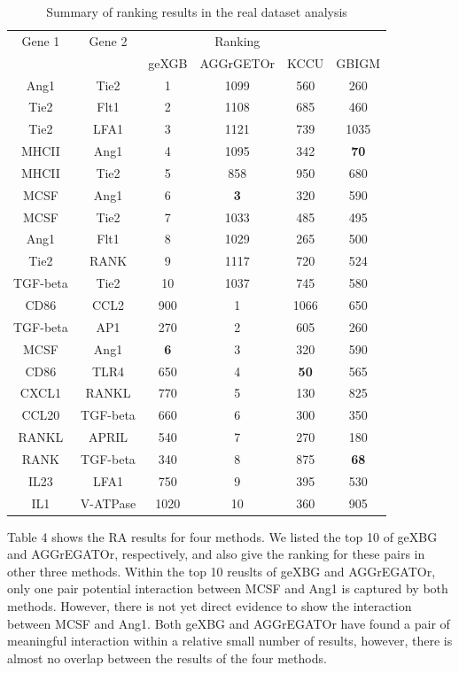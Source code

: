 \documentclass[11pt]{article}
\theoremstyle{plain}
\theoremstyle{definition}
\theoremstyle{remark}
\begin{document}
\begin{table}[H]\footnotesize
\centering
\caption{Summary of ranking results in the real dataset analysis}
\begin{tabular}{|c|c|cccc|}
  \hline
  Gene 1&Gene 2&&Ranking&&\\
  \cline{3-6}
  &&geXGB&AGGrGETOr&KCCU&GBIGM\\
  \hline
  Ang1&Tie2&1&1099&560&260\\
  \hline
  Tie2&Flt1&2&1108&685&460\\
  \hline
  Tie2&LFA1&3&1121&739&1035\\
  \hline
  MHCII&Ang1&4&1095&342&{\bf 70}\\
  \hline
  MHCII&Tie2&5&858&950&680\\
  \hline
  MCSF&Ang1&6&{\bf 3}&320&590\\
  \hline
  MCSF&Tie2&7&1033&485&495\\
  \hline
  Ang1&Flt1&8&1029&265&500\\
  \hline
  Tie2&RANK&9&1117&720&524\\
  \hline
  TGF-beta&Tie2&10&1037&745&580\\
  \hline
  CD86&CCL2&900&1&1066&650\\
  \hline
  TGF-beta&AP1&270&2&605&260\\
  \hline
  MCSF&Ang1&{\bf 6}&3&320&590\\
  \hline
  CD86&TLR4&650&4&{\bf 50}&565\\
  \hline
  CXCL1&RANKL&770&5&130&825\\
  \hline
  CCL20&TGF-beta&660&6&300&350\\
  \hline
  RANKL&APRIL&540&7&270&180\\
  \hline
  RANK&TGF-beta&340&8&875&{\bf 68}\\
  \hline
  IL23&LFA1&750&9&395&530\\
  \hline
  IL1&V-ATPase&1020&10&360&905\\
  \hline
\end{tabular}
\end{table}

\noindent Table 4 shows the RA results for four methods. We listed the top 10 of geXBG and AGGrEGATOr, respectively, and also give the ranking for these pairs in other three methods. Within the top 10 reuslts of geXBG and AGGrEGATOr, only one pair potential interaction between MCSF and Ang1 is captured by both methods. However, there is not yet direct evidence to show the interaction between MCSF and Ang1. Both geXBG and AGGrEGATOr have found a pair of meaningful interaction within a relative small number of results, however, there is almost no overlap between the results of the four methods.\\
\end{document}
